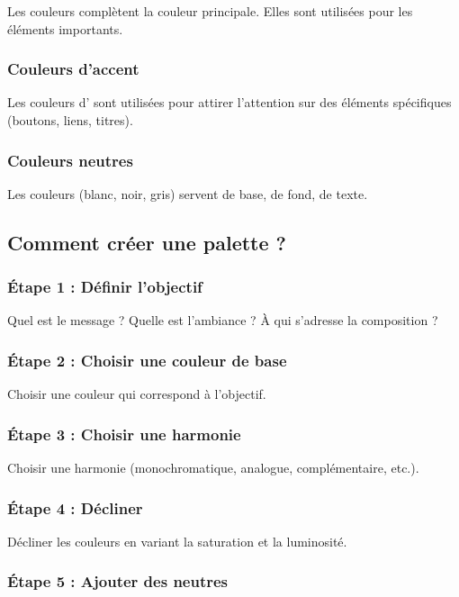 Les couleurs  complètent la couleur principale. Elles sont utilisées pour les éléments importants.

\subsubsection{Couleurs d'accent}

Les couleurs d' sont utilisées pour attirer l'attention sur des éléments spécifiques (boutons, liens, titres).

\subsubsection{Couleurs neutres}

Les couleurs  (blanc, noir, gris) servent de base, de fond, de texte.

\subsection{Comment créer une palette ?}

\subsubsection{Étape 1 : Définir l'objectif}

Quel est le message ? Quelle est l'ambiance ? À qui s'adresse la composition ?

\subsubsection{Étape 2 : Choisir une couleur de base}

Choisir une couleur qui correspond à l'objectif.

\subsubsection{Étape 3 : Choisir une harmonie}

Choisir une harmonie (monochromatique, analogue, complémentaire, etc.).

\subsubsection{Étape 4 : Décliner}

Décliner les couleurs en variant la saturation et la luminosité.

\subsubsection{Étape 5 : Ajouter des neutres}

